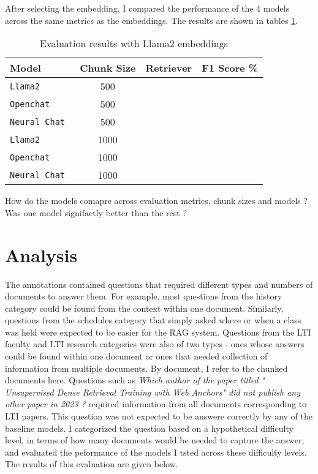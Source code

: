 \documentclass[11pt]{article}
\begin{document}
After selecting the embedding, I compared the performance of the 4 models across the same metrics as the embeddings. The results are shown in tables \ref{tab:tab3}.
  
\begin{table}
  \centering
    \begin{tabular}{ l c c r }
    \hline
      \textbf{Model} & \textbf{Chunk Size} & \textbf{Retriever} & \textbf{F1 Score \%} \\
      \hline
      \verb|Llama2 | & 500 &  {} & {} \\
      \verb|Openchat | & 500 & {}  & {}\\ 
      \verb|Neural Chat | & 500 &{}  & {}\\ 
      \verb|Llama2 | & 1000 &  {}  & {}\\
      \verb|Openchat | & 1000 & {} \ & {} \\ 
      \verb|Neural Chat | & 1000 &{}  & {}\\ 
      \hline
    \end{tabular}
  \caption{Evaluation results with Llama2 embeddings}
  \label{tab:tab3}
  \end{table}

How do the models comapre across evaluation metrics, chunk sizes and models ?
Was one model signifactly better than the rest ?

\section{Analysis}
The annotations contained questions that required different types and numbers of documents to answer them. For example, most questions from the history category could be found from the context within one document. Similarly, questions from the schedules category that simply asked where or when a class was held were expected to be easier for the RAG system.
Questions from the LTI faculty and LTI research categories were also of two types - ones whose answers could be found within one document or ones that needed collection of information from multiple documents. By document, I refer to the chunked documents here.
Questions such as \textit{Which author of the paper titled " Unsupervised Dense Retrieval Training with Web Anchors" did not publish any other paper in 2023 ?} required information from all documents corresponding to LTI papers. This question was not expected to be answere correctly by any of the baseline models.
I categorized the question based on a hypothetical difficulty level, in terms of how many documents would be needed to capture the answer, and evaluated the peformance of the models I tsted across these difficulty levels. The results of this evaluation are given below.
\end{document}
